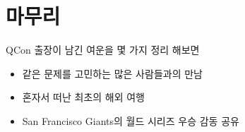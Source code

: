 \documentclass[11pt]{article}
\begin{document}
\section{마무리}

QCon 출장이 남긴 여운을 몇 가지 정리 해보면
\begin{itemize}
\item 같은 문제를 고민하는 많은 사람들과의 만남
\item 혼자서 떠난 최초의 해외 여행
\item San Francisco Giants의 월드 시리즈 우승 감동 공유
\end{itemize}

%

\pagebreak



\end{document}
